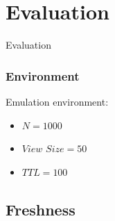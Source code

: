 \documentclass{beamer}
\begin{document}
\section{Evaluation}

\begin{frame}[c]
\Huge{\centerline{Evaluation}}

\end{frame}

\begin{frame}\frametitle{Environment}
Emulation environment:
\begin{itemize}
  \item $N = 1000$
  \item $View$ $Size = 50$
  \item $TTL = 100$
\end{itemize}
\end{frame}

\subsection{Freshness}
\end{document}
